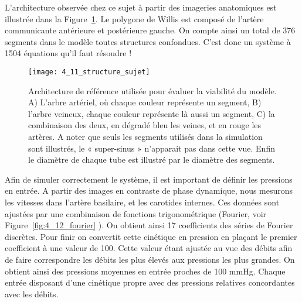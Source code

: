 L’architecture observée chez ce sujet à partir des imageries anatomiques est illustrée dans la
Figure~\ref{fig:4_11_structure_sujet}. Le polygone de Willis est composé de l’artère communicante antérieure et postérieure
gauche. On compte ainsi un total de 376 segments dans le modèle toutes structures confondues. C’est
donc un système à 1504 équations qu’il faut résoudre !
\begin{figure}[!t]
\centering
\texttt{[image: 4\_11\_structure\_sujet]}
\caption{Architecture de référence utilisée pour évaluer la viabilité du modèle. A) L'arbre artériel, où chaque couleur
représente un segment, B) l'arbre veineux, chaque couleur représente là aussi un segment, C) la combinaison des deux, en
dégradé bleu les veines, et en rouge les artères. A noter que seuls les segments utilisés dans la simulation sont illustrés, le
« super-sinus » n’apparait pas dans cette vue. Enfin le diamètre de chaque tube est illustré par le diamètre des segments.}
\label{fig:4_11_structure_sujet}	
\end{figure}
Afin de simuler correctement le système, il est important de définir les pressions en entrée. A
partir des images en contraste de phase dynamique, nous mesurons les vitesses dans l’artère basilaire,
et les carotides internes. Ces données sont ajustées par une combinaison de fonctions trigonométrique
(Fourier, voir Figure~\ref{fig:4_12_fourier}	). On obtient ainsi 17 coefficients des séries de Fourier discrètes. Pour finir on
convertit cette cinétique en pression en plaçant le premier coefficient à une valeur de 100. Cette valeur
étant ajustée au vue des débits afin de faire correspondre les débits les plus élevés aux pressions les
plus grandes. On obtient ainsi des pressions moyennes en entrée proches de 100 mmHg. Chaque
entrée disposant d’une cinétique propre avec des pressions relatives concordantes avec les débits.

